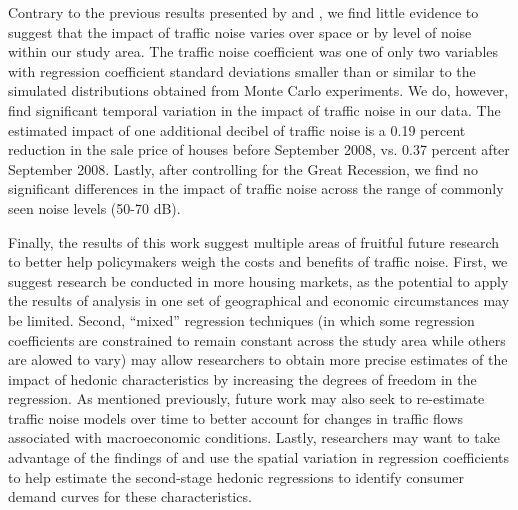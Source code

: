 \documentclass{article}\usepackage{graphicx, color}
\begin{document}
Contrary to the previous results presented by \citet{MarmolejoDuarteCarlos;GonzalezTamez2009} and \citet{Theebe2004a}, we find little evidence to suggest that the impact of traffic noise varies over space or by level of noise within our study area. The traffic noise coefficient was one of only two variables with regression coefficient standard deviations smaller than or similar to the simulated distributions obtained from Monte Carlo experiments. We do, however, find significant temporal variation in the impact of traffic noise in our data. The estimated impact of one additional decibel of traffic noise is a 0.19 percent reduction in the sale price of houses before September 2008, vs. 0.37 percent after September 2008. Lastly, after controlling for the Great Recession, we find no significant differences in the impact of traffic noise across the range of commonly seen noise levels (50-70 dB).

Finally, the results of this work suggest multiple areas of fruitful future research to better help policymakers weigh the costs and benefits of traffic noise. First, we suggest research be conducted in more housing markets, as the potential to apply the results of analysis in one set of geographical and economic circumstances may be limited. Second, ``mixed'' regression techniques (in which some regression coefficients are constrained to remain constant across the study area while others are alowed to vary) may allow researchers to obtain more precise estimates of the impact of hedonic characteristics by increasing the degrees of freedom in the regression. As mentioned previously, future work may also seek to re-estimate traffic noise models over time to better account for changes in traffic flows associated with macroeconomic conditions. Lastly, researchers may want to take advantage of the findings of \citet{Carruthers2010} and use the spatial variation in regression coefficients to help estimate the second-stage hedonic regressions to identify consumer demand curves for these characteristics.



\end{document}
